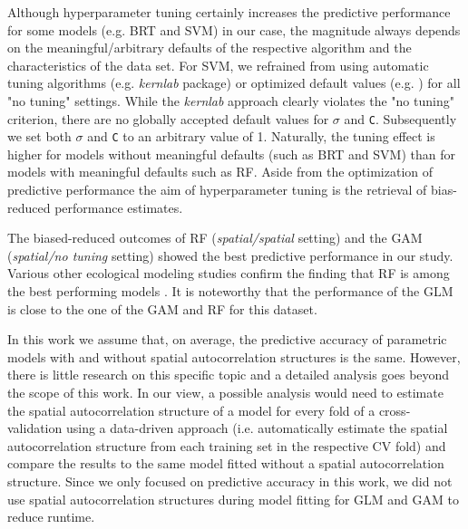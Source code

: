 \documentclass[review]{elsarticle}
\begin{document}
Although hyperparameter tuning certainly increases the predictive performance for some models (e.g. BRT and SVM) in our case, the magnitude always depends on the meaningful/arbitrary defaults of the respective algorithm and the characteristics of the data set.
For SVM, we refrained from using automatic tuning algorithms (e.g. \textit{kernlab} package) or optimized default values (e.g. \cite{e1071}) for all "no tuning" settings.
While the \textit{kernlab} approach clearly violates the "no tuning" criterion, there are no globally accepted default values for $\sigma$ and \texttt{C}.
Subsequently we set both $\sigma$ and \texttt{C} to an arbitrary value of 1.
Naturally, the tuning effect is higher for models without meaningful defaults (such as BRT and SVM) than for models with meaningful defaults such as RF.
Aside from the optimization of predictive performance the aim of hyperparameter tuning is the retrieval of bias-reduced performance estimates.

The biased-reduced outcomes of \ac{RF} (\emph{spatial/spatial} setting) and the GAM (\emph{spatial/no tuning} setting) showed the best predictive performance in our study.
Various other ecological modeling studies confirm the finding that RF is among the best performing models \citep{Bahn2012, Jarnevich2017, Smolinski2016, Vorpahl2012}.
It is noteworthy that the performance of the GLM is close to the one of the GAM and RF for this dataset.

In this work we assume that, on average, the predictive accuracy of parametric models with and without spatial autocorrelation structures is the same.
However, there is little research on this specific topic \citep{Dormann2007b, Mets2017} and a detailed analysis goes beyond the scope of this work.
In our view, a possible analysis would need to estimate the spatial autocorrelation structure of a model for every fold of a cross-validation using a data-driven approach (i.e. automatically estimate the spatial autocorrelation structure from each training set in the respective CV fold) and compare the results to the same model fitted without a spatial autocorrelation structure.
Since we only focused on predictive accuracy in this work, we did not use spatial autocorrelation structures during model fitting for \ac{GLM} and \ac{GAM} to reduce runtime.
\end{document}
